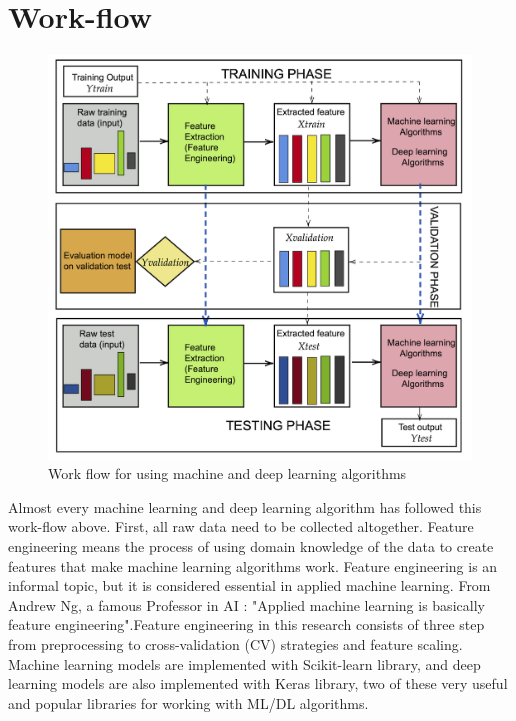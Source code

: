 \documentclass[12pt,a4paper]{report}
\begin{document}
\section{Work-flow}

\begin{figure}[H]
\centering
\includegraphics[scale=0.8]{Fig/3.png}
\caption{Work flow for using machine and deep learning algorithms}
\end{figure}

Almost every machine learning and deep learning algorithm has followed this work-flow above. First, all raw data need to be collected altogether. Feature engineering means the process of using domain knowledge of the data to create features that make machine learning algorithms work. Feature engineering is an informal topic, but it is considered essential in applied machine learning\cite{feature}. From Andrew Ng, a famous Professor in AI : "Applied machine learning is basically feature engineering".Feature engineering in this research consists of three step from preprocessing to cross-validation (CV) strategies and feature scaling. Machine learning models are implemented with Scikit-learn library, and deep learning models are also implemented with Keras library, two of these very useful and popular libraries for working with ML/DL algorithms.
\end{document}
